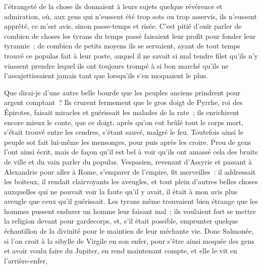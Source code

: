 \documentclass[french,twoside]{book} %
\begin{document}
l’étrangeté de la chose ils donnaient à leurs sujets quelque révérence et admiration, où, aux gens qui n’eussent été trop sots ou trop asservis, ils n’eussent apprêté, ce m’est avis, sinon passe-temps et risée. C’est pitié d’ouïr parler de combien de choses les tyrans du temps passé faisaient leur profit pour fonder leur tyrannie ; de combien de petits moyens ils se servaient, ayant de tout temps trouvé ce populas fait à leur poste, auquel il ne savait si mal tendre filet qu’ils n’y vinssent prendre lequel ils ont toujours trompé à si bon marché qu’ils ne l’assujettissaient jamais tant que lorsqu’ils s’en moquaient le plus.\par
Que dirai-je d’une autre belle bourde que les peuples anciens prindrent pour argent comptant ? Ils crurent fermement que le gros doigt de Pyrrhe, roi des Épirotes, faisait miracles et guérissait les malades de la rate ; ils enrichirent encore mieux le conte, que ce doigt, après qu’on eut brûlé tout le corps mort, s’était trouvé entre les cendres, s’étant sauvé, malgré le feu. Toutefois ainsi le peuple sot fait lui-même les mensonges, pour puis après les croire. Prou de gens l’ont ainsi écrit, mais de façon qu’il est bel à voir qu’ils ont amassé cela des bruits de ville et du vain parler du populas. Vespasien, revenant d’Assyrie et passant à Alexandrie pour aller à Rome, s’emparer de l’empire, fit merveilles : il addressait les boiteux, il rendait clairvoyants les aveugles, et tout plein d’autres belles choses auxquelles qui ne pouvait voir la faute qu’il y avait, il était à mon avis plus aveugle que ceux qu’il guérissait. Les tyrans même trouvaient bien étrange que les hommes pussent endurer un homme leur faisant mal ; ils voulaient fort se mettre la religion devant pour gardecorps, et, s’il était possible, emprunter quelque échantillon de la divinité pour le maintien de leur méchante vie. Donc Salmonée, si l’on croit à la sibylle de Virgile en son enfer, pour s’être ainsi moquée des gens et avoir voulu faire du Jupiter, en rend maintenant compte, et elle le vit en l’arrière-enfer,\par
\end{document}
